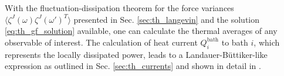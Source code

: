 With the fluctuation-dissipation theorem for the force variances $\langle \zeta^J(\omega) \zeta^J(\omega')^T \rangle$ presented in Sec. \ref{sec:th_langevin} and the solution \eqref{eq:th_gf_solution} available, one can calculate the thermal averages of any observable of interest. The calculation of heat current $ Q_i^{\textrm{bath}}$ to bath $i$, which represents the locally dissipated power, leads to a Landauer-B\"uttiker-like expression \cite{landauer57,buttiker92} as outlined in Sec. \ref{sec:th_currents} and shown in detail in . %


